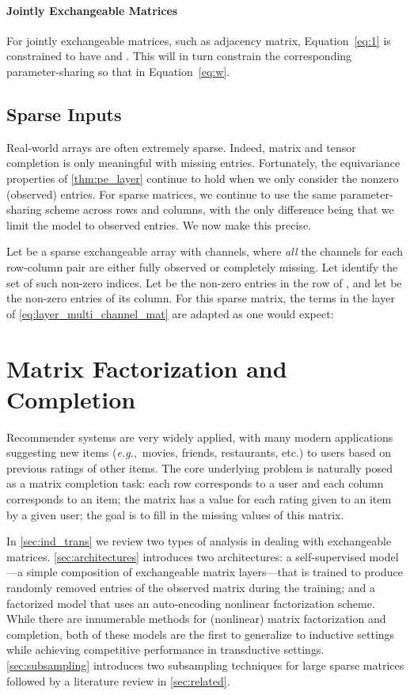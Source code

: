 \documentclass{article}
\newcommand{\eg}[0]{\emph{e.g.},~}
\theoremstyle{definition}
\begin{document}
\vspace{-.6em minus .3em}\paragraph{{Jointly Exchangeable Matrices}}
For jointly exchangeable matrices, such as adjacency matrix, Equation~\cref{eq:1} is constrained to have  and .
This will in turn constrain the corresponding parameter-sharing so that  in Equation~\cref{eq:w}.

\subsection{Sparse Inputs}\label{sec:sparse}
Real-world arrays are often extremely sparse. 
Indeed, matrix and tensor completion is only meaningful with missing entries. Fortunately, the equivariance properties of \cref{thm:pe_layer} continue to hold when we only consider the nonzero (observed) entries. For sparse matrices, we continue to use the same parameter-sharing scheme across rows and columns, with the only difference being that we limit the model to observed entries. We now make this precise.

Let  be a sparse exchangeable array with  channels, where \textit{all} the channels for each row-column pair  are either fully observed or completely missing.
Let  identify the set of such non-zero indices.
Let  be the non-zero entries in the  row of , and let  be the non-zero entries of its  column. For this sparse matrix, the terms in the layer of \cref{eq:layer_multi_channel_mat} are adapted as one would expect:



\section{Matrix Factorization and Completion}\label{sec:fact_comp}
Recommender systems are very widely applied, with many modern applications suggesting new items (\eg movies, friends, restaurants, etc.) to users based on previous ratings of other items. 
The core underlying problem is naturally posed as a matrix completion task: each row corresponds to a user and each column corresponds to an item; the matrix has a value for each rating given to an item by a given user; the goal is to fill in the missing values of this matrix. 

In \cref{sec:ind_trans} we review two types of analysis in dealing with exchangeable matrices.
\cref{sec:architectures} introduces two architectures: a self-supervised model---a simple composition of exchangeable matrix layers---that is trained to produce randomly removed entries of the observed matrix during the training; and a factorized model that uses an auto-encoding nonlinear factorization scheme. While there are innumerable methods for (nonlinear) matrix factorization and completion, both of these models are the first to generalize to inductive settings while achieving competitive performance in transductive settings. 
\cref{sec:subsampling} introduces two subsampling techniques for large sparse matrices followed by a literature review in \cref{sec:related}. 
\end{document}
